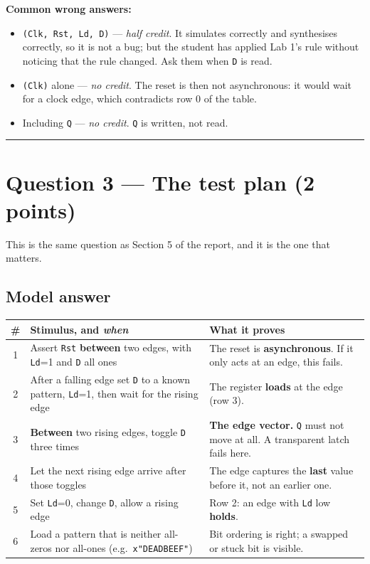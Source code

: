\documentclass[11pt]{article}
\newcommand{\code}[1]{\texttt{#1}}
\newcommand{\hr}{\vspace{2pt}\hrule\vspace{6pt}}
\begin{document}
\textbf{Common wrong answers:}
\begin{itemize}[leftmargin=1.6em,itemsep=1pt]
\item \code{(Clk, Rst, Ld, D)} --- \emph{half credit}. It simulates correctly and
synthesises correctly, so it is not a bug; but the student has applied Lab 1's
rule without noticing that the rule changed. Ask them when \code{D} is read.
\item \code{(Clk)} alone --- \emph{no credit}. The reset is then not asynchronous:
it would wait for a clock edge, which contradicts row 0 of the table.
\item Including \code{Q} --- \emph{no credit}. \code{Q} is written, not read.
\end{itemize}

\vspace{4pt}\hr

\section*{Question 3 --- The test plan (2 points)}

This is the same question as Section 5 of the report, and it is the one that
matters.

\subsection*{Model answer}

\begin{center}
\small
\begin{tabular}{c>{\raggedright\arraybackslash}p{6.0cm}>{\raggedright\arraybackslash}p{7.2cm}}
\toprule
\# & Stimulus, and \emph{when} & What it proves \\
\midrule
1 & Assert \code{Rst} \textbf{between} two edges, with \code{Ld}=1 and \code{D} all ones
  & The reset is \textbf{asynchronous}. If it only acts at an edge, this fails. \\
2 & After a falling edge set \code{D} to a known pattern, \code{Ld}=1, then wait for the rising edge
  & The register \textbf{loads} at the edge (row 3). \\
3 & \textbf{Between} two rising edges, toggle \code{D} three times
  & \textbf{The edge vector.} \code{Q} must not move at all. A transparent latch fails here. \\
4 & Let the next rising edge arrive after those toggles
  & The edge captures the \textbf{last} value before it, not an earlier one. \\
5 & Set \code{Ld}=0, change \code{D}, allow a rising edge
  & Row 2: an edge with \code{Ld} low \textbf{holds}. \\
6 & Load a pattern that is neither all-zeros nor all-ones (e.g.\ \code{x"DEADBEEF"})
  & Bit ordering is right; a swapped or stuck bit is visible. \\
\bottomrule
\end{tabular}
\end{center}
\end{document}
